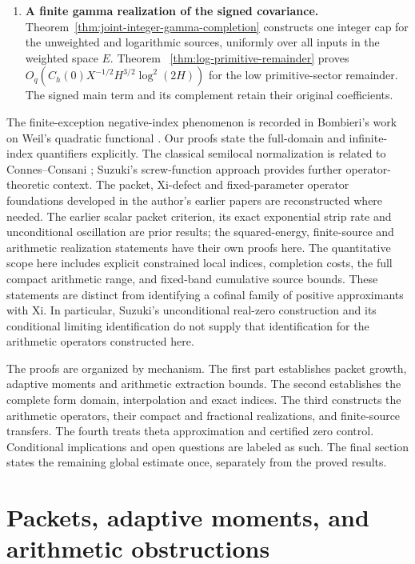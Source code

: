 \documentclass[11pt]{article}
\theoremstyle{remark}\newtheorem{remark}[theorem]{Remark}
\begin{document}
\begin{enumerate}
\item \textbf{A finite gamma realization of the signed covariance.}
Theorem~\ref{thm:joint-integer-gamma-completion} constructs one
integer cap for the unweighted and logarithmic sources, uniformly
over all inputs in the weighted space \(E\). Theorem~
\ref{thm:log-primitive-remainder} proves
\(O_q(C_h(0)X^{-1/2}H^{3/2}\log^2(2H))\) for the low
primitive-sector remainder. The signed main term and its
complement retain their original coefficients.
\end{enumerate}

The finite-exception negative-index phenomenon is recorded in
Bombieri's work on Weil's quadratic functional
\cite{BombieriWeil}. Our proofs state the full-domain and
infinite-index quantifiers explicitly. The classical semilocal
normalization is related to Connes--Consani
\cite{ConnesConsani}; Suzuki's screw-function approach
\cite{Suzuki2026} provides further operator-theoretic context.
The packet, Xi-defect and fixed-parameter operator foundations
developed in the author's earlier papers
\cite{PacketSource,OscillationSource,XiSource,OperatorSource,KernelSource}
are reconstructed where needed. The earlier scalar packet criterion,
its exact exponential strip rate and unconditional oscillation
are prior results; the squared-energy, finite-source and
arithmetic realization statements have their own proofs here.
The quantitative scope here includes explicit constrained local
indices, completion costs, the full compact arithmetic range, and
fixed-band cumulative source bounds. These statements are distinct
from identifying a cofinal family of positive approximants with Xi.
In particular, Suzuki's unconditional real-zero construction and
its conditional limiting identification
\cite[Theorem 1.5 and Corollary 1.6]{Suzuki2026} do not supply that
identification for the arithmetic operators constructed here.

The proofs are organized by mechanism. The first part establishes
packet growth, adaptive moments and arithmetic extraction bounds.
The second establishes the complete form domain, interpolation and
exact indices. The third constructs the arithmetic operators,
their compact and fractional realizations, and finite-source
transfers. The fourth treats theta approximation and certified
zero control. Conditional implications and open questions are
labeled as such. The final section states the remaining global
estimate once, separately from the proved results.

\part{Packets, adaptive moments, and arithmetic obstructions}
\end{document}
